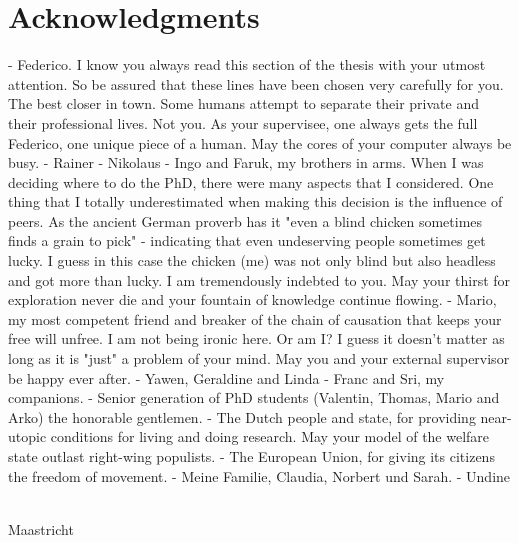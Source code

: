 \chapter{Acknowledgments}
- Federico. I know you always read this section of the thesis with your utmost attention. So be assured that these lines have been chosen very carefully for you. The best closer in town. Some humans attempt to separate their private and their professional lives. Not you. As your supervisee, one always gets the full Federico, one unique piece of a human. May the cores of your computer always be busy.
- Rainer
- Nikolaus
- Ingo and Faruk, my brothers in arms. When I was deciding where to do the PhD, there were many aspects that I considered. One thing that I totally underestimated when making this decision is the influence of peers. As the ancient German proverb has it "even a blind chicken sometimes finds a grain to pick" - indicating that even undeserving people sometimes get lucky. I guess in this case the chicken (me) was not only blind but also headless and got more than lucky. I am tremendously indebted to you. May your thirst for exploration never die and your fountain of knowledge continue flowing.
- Mario, my most competent friend and breaker of the chain of causation that keeps your free will unfree. I am not being ironic here. Or am I? I guess it doesn't matter as long as it is "just" a problem of your mind. May you and your external supervisor be happy ever after.
- Yawen, Geraldine and Linda
- Franc and Sri, my companions.
- Senior generation of PhD students (Valentin, Thomas, Mario and Arko) the honorable gentlemen.
- The Dutch people and state, for providing near-utopic conditions for living and doing research. May your model of the welfare state outlast right-wing populists.
- The European Union, for giving its citizens the freedom of movement.
- Meine Familie, Claudia, Norbert und Sarah.
- Undine

{\flushright \thesisauthor \\ Maastricht \\ \thesisdate \\ }